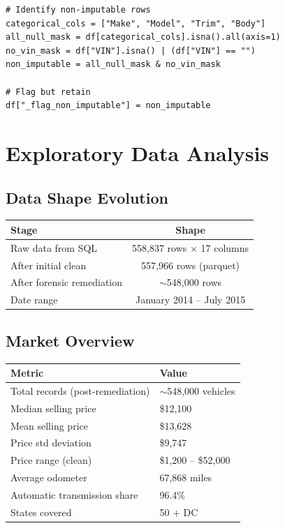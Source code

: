 \documentclass[12pt,a4paper]{article}
\begin{document}
\begin{lstlisting}
# Identify non-imputable rows
categorical_cols = ["Make", "Model", "Trim", "Body"]
all_null_mask = df[categorical_cols].isna().all(axis=1)
no_vin_mask = df["VIN"].isna() | (df["VIN"] == "")
non_imputable = all_null_mask & no_vin_mask

# Flag but retain
df["_flag_non_imputable"] = non_imputable
\end{lstlisting}

\section{Exploratory Data Analysis}

\subsection{Data Shape Evolution}

\begin{center}
\begin{tabular}{lc}
\toprule
\textbf{Stage} & \textbf{Shape} \\
\midrule
Raw data from SQL & 558,837 rows $\times$ 17 columns \\
After initial clean & 557,966 rows (parquet) \\
After forensic remediation & $\sim$548,000 rows \\
Date range & January 2014 -- July 2015 \\
\bottomrule
\end{tabular}
\end{center}

\subsection{Market Overview}

\begin{center}
\begin{tabular}{ll}
\toprule
\textbf{Metric} & \textbf{Value} \\
\midrule
Total records (post-remediation) & $\sim$548,000 vehicles \\
Median selling price & \$12,100 \\
Mean selling price & \$13,628 \\
Price std deviation & \$9,747 \\
Price range (clean) & \$1,200 -- \$52,000 \\
Average odometer & 67,868 miles \\
Automatic transmission share & 96.4\% \\
States covered & 50 + DC \\
\bottomrule
\end{tabular}
\end{center}
\end{document}
